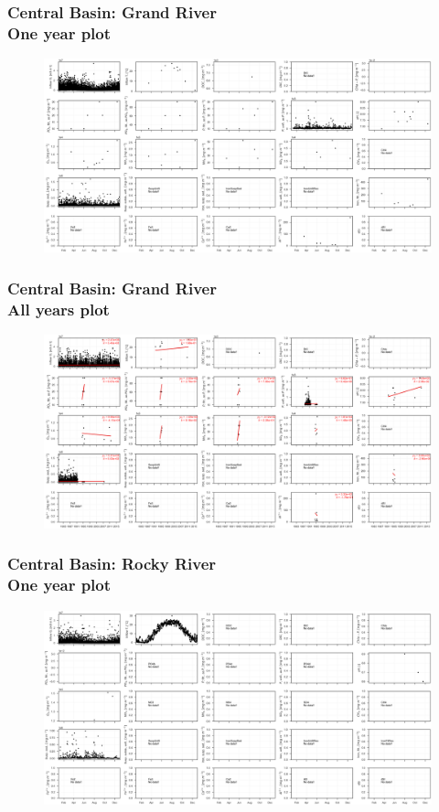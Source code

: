 \documentclass{beamer}
\begin{document}
\begin{frame}
\frametitle{Central Basin: Grand River\\ One year plot}
\begin{figure}
\includegraphics[width=\textwidth]{rivers/Central basin/plot_1yr grandriver.png}
\end{figure}
\end{frame}

\begin{frame}
\frametitle{Central Basin: Grand River\\ All years plot}
\begin{figure}
\includegraphics[width=\textwidth]{rivers/Central basin/plot_all grandriver.png}
\end{figure}
\end{frame}

\begin{frame}
\frametitle{Central Basin: Rocky River\\ One year plot}
\begin{figure}
\includegraphics[width=\textwidth]{rivers/Central basin/plot_1yr rockyriver.png}
\end{figure}
\end{frame}
\end{document}
